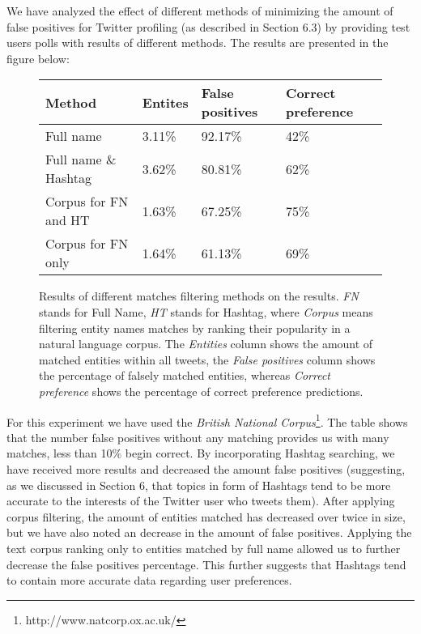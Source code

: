 We have analyzed the effect of different methods of minimizing the amount of false
positives for Twitter profiling (as described in Section 6.3) by providing test users
polls with results of different methods. The results are presented in the figure below:

\begin{figure}[h!]
  \begin{center}
    \begin{tabular}{ | p{4cm} | p{2cm} | p{2cm} | p{2cm} | } \hline
      Method & Entites & False positives & Correct preference \\ \hline
      Full name & 3.11\% & 92.17\% & 42\% \\ \hline
      Full name \& Hashtag & 3.62\% & 80.81\% & 62\% \\ \hline
      Corpus for FN and HT & 1.63\% & 67.25\% & 75\% \\ \hline
      Corpus for FN only & 1.64\% & 61.13\% & 69\% \\ \hline
    \end{tabular}
    \caption{Results of different matches filtering methods on the results. \textit{FN} stands for Full Name,
    \textit{HT} stands for Hashtag, where \textit{Corpus} means filtering entity names matches by ranking
    their popularity in a natural language corpus. The \textit{Entities} column shows the amount of matched
    entities within all tweets, the \textit{False positives} column shows the percentage of falsely matched
    entities, whereas \textit{Correct preference} shows the percentage of correct preference predictions.}
  \end{center}
\end{figure}

For this experiment we have used the \textit{British National Corpus}\footnote{http://www.natcorp.ox.ac.uk/}.
The table shows that the number false positives without any matching provides us with many matches, less than
10\% begin correct. By incorporating Hashtag searching, we have received more results and decreased the amount
false positives (suggesting, as we discussed in Section 6, that topics in form of Hashtags tend to be more
accurate to the interests of the Twitter user who tweets them). After applying corpus filtering, the amount of
entities matched has decreased over twice in size, but we have also noted an decrease in the amount of false positives.
Applying the text corpus ranking only to entities matched by full name allowed us to further decrease the false
positives percentage. This further suggests that Hashtags tend to contain more accurate data regarding
user preferences.

